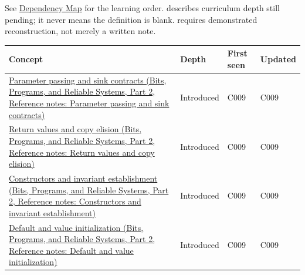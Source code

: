See \hyperref[appendix-4ad47bdd269a]{Dependency Map} for the learning order.  describes curriculum depth still pending; it never means the definition is blank.  requires demonstrated reconstruction, not merely a written note.

{\def\LTcaptype{none} %
\begin{longtable}[]{@{}
  >{\raggedright\arraybackslash}p{}
  >{\raggedright\arraybackslash}p{}
  >{\raggedright\arraybackslash}p{}
  >{\raggedright\arraybackslash}p{}@{}}
\toprule\noalign{}
\begin{minipage}[b]{\linewidth}\raggedright
Concept
\end{minipage} & \begin{minipage}[b]{\linewidth}\raggedright
Depth
\end{minipage} & \begin{minipage}[b]{\linewidth}\raggedright
First seen
\end{minipage} & \begin{minipage}[b]{\linewidth}\raggedright
Updated
\end{minipage} \\
\midrule\noalign{}
\endhead
\bottomrule\noalign{}
\endlastfoot
\href{../01-Bits-Programs-and-Reliable-Systems-P02/main.pdf\#appendix-d5908f75721f}{Parameter passing and sink contracts (Bits, Programs, and Reliable Systems, Part 2, Reference notes: Parameter passing and sink contracts)} & Introduced & C009 & C009 \\
\href{../01-Bits-Programs-and-Reliable-Systems-P02/main.pdf\#appendix-b08d3788c5c6}{Return values and copy elision (Bits, Programs, and Reliable Systems, Part 2, Reference notes: Return values and copy elision)} & Introduced & C009 & C009 \\
\href{../01-Bits-Programs-and-Reliable-Systems-P02/main.pdf\#appendix-7f8ec83d0886}{Constructors and invariant establishment (Bits, Programs, and Reliable Systems, Part 2, Reference notes: Constructors and invariant establishment)} & Introduced & C009 & C009 \\
\href{../01-Bits-Programs-and-Reliable-Systems-P02/main.pdf\#appendix-ba8c1a9fe03f}{Default and value initialization (Bits, Programs, and Reliable Systems, Part 2, Reference notes: Default and value initialization)} & Introduced & C009 & C009 \\

\end{longtable}}
